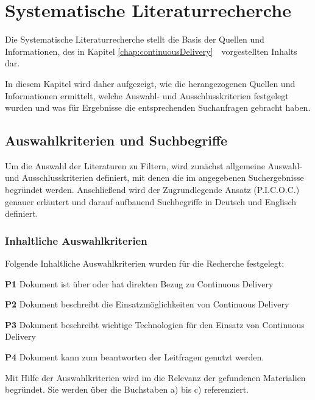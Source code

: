 \chapter{Systematische Literaturrecherche}
\label{chap:sysRecherche}
Die Systematische Literaturrecherche stellt die Basis der Quellen und Informationen, des in Kapitel \ref{chap:continuousDelivery}\ \ vorgestellten Inhalts dar.

In diesem Kapitel wird daher aufgezeigt, wie die herangezogenen Quellen und Informationen ermittelt, welche Auswahl- und Ausschlusskriterien festgelegt wurden und was für Ergebnisse die entsprechenden Suchanfragen gebracht haben.

\section{Auswahlkriterien und Suchbegriffe}
\label{sec:auswahlkriterienUndSuchbegriffe}
Um die Auswahl der Literaturen zu Filtern, wird zunächst allgemeine Auswahl- und Ausschlusskriterien definiert, mit denen die im  angegebenen Suchergebnisse begründet werden.
Anschließend wird der Zugrundlegende Ansatz (P.I.C.O.C.) genauer erläutert und darauf aufbauend Suchbegriffe in Deutsch und Englisch definiert.

\subsection{Inhaltliche Auswahlkriterien}
\label{subsec:inhaltlicheAuswahlkriterien}
Folgende Inhaltliche Auswahlkriterien wurden für die Recherche festgelegt:
\begin{list}{label}{spacing}
	\item[\textbf{P1}] Dokument ist über oder hat direkten Bezug zu Continuous Delivery
	\item[\textbf{P2}] Dokument beschreibt die Einsatzmöglichkeiten von Continuous Delivery
	\item[\textbf{P3}] Dokument beschreibt wichtige Technologien für den Einsatz von Continuous Delivery
	\item[\textbf{P4}] Dokument kann zum beantworten der Leitfragen genutzt werden.
\end{list}
Mit Hilfe der Auswahlkriterien wird im  die Relevanz der gefundenen Materialien begründet. Sie werden über die Buchstaben a) bis c) referenziert.
